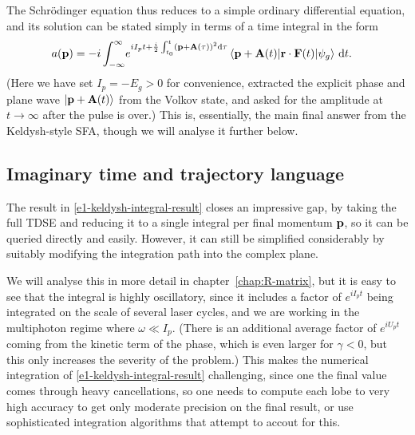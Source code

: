 The Schrödinger equation thus reduces to a simple ordinary differential equation, and its solution can be stated simply in terms of a time integral in the form
\begin{align}
a(\vbp)
& =
-i
\int_{-\infty}^{\infty} \!
e^{iI_p t+\frac i2 \int_{\tn}^{t} \left(\vbp+\vba(\tau)\right)^2 \d\tau}\matrixel{\vbp+\vba(t)}{\vbr\cdot\vbf(t)}{\psi_g}
\, \mathrm dt
.
\label{e1-keldysh-integral-result}
\end{align}
(Here we have set $I_p=-E_g>0$ for convenience, extracted the explicit phase and plane wave $\ket{\vb{p}+\vb{A}(t)}$ from the Volkov state, and asked for the amplitude at $t\to\infty$ after the pulse is over.)  This is, essentially, the main final answer from the Keldysh-style SFA, though we will analyse it further below. 




\subsection{Imaginary time and trajectory language}
The result in \eqref{e1-keldysh-integral-result} closes an impressive gap, by taking the full TDSE and reducing it to a single integral per final momentum $\vb{p}$, so it can be queried directly and easily. However, it can still be simplified considerably by suitably modifying the integration path into the complex plane. 

We will analyse  this in more detail in chapter~\ref{chap:R-matrix}, but it is easy to see that the integral is highly oscillatory, since it includes a factor of $e^{iI_pt}$ being integrated on the scale of several laser cycles, and we are working in the multiphoton regime where $\omega \ll I_p$. (There is an additional average factor of $e^{iU_pt}$ coming from the kinetic term of the phase, which is even larger for $\gamma<0$, but this only increases the severity of the problem.) This makes the numerical integration of \eqref{e1-keldysh-integral-result} challenging, since one the final value comes through heavy cancellations, so one needs to compute each lobe to very high accuracy to get only moderate precision on the final result, or use sophisticated integration algorithms that attempt to accout for this.

